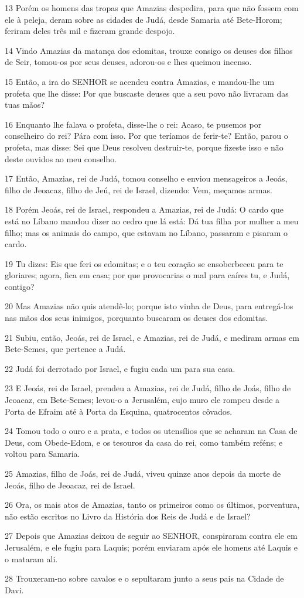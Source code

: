 \par 13 Porém os homens das tropas que Amazias despedira, para que não fossem com ele à peleja, deram sobre as cidades de Judá, desde Samaria até Bete-Horom; feriram deles três mil e fizeram grande despojo.
\par 14 Vindo Amazias da matança dos edomitas, trouxe consigo os deuses dos filhos de Seir, tomou-os por seus deuses, adorou-os e lhes queimou incenso.
\par 15 Então, a ira do SENHOR se acendeu contra Amazias, e mandou-lhe um profeta que lhe disse: Por que buscaste deuses que a seu povo não livraram das tuas mãos?
\par 16 Enquanto lhe falava o profeta, disse-lhe o rei: Acaso, te pusemos por conselheiro do rei? Pára com isso. Por que teríamos de ferir-te? Então, parou o profeta, mas disse: Sei que Deus resolveu destruir-te, porque fizeste isso e não deste ouvidos ao meu conselho.
\par 17 Então, Amazias, rei de Judá, tomou conselho e enviou mensageiros a Jeoás, filho de Jeoacaz, filho de Jeú, rei de Israel, dizendo: Vem, meçamos armas.
\par 18 Porém Jeoás, rei de Israel, respondeu a Amazias, rei de Judá: O cardo que está no Líbano mandou dizer ao cedro que lá está: Dá tua filha por mulher a meu filho; mas os animais do campo, que estavam no Líbano, passaram e pisaram o cardo.
\par 19 Tu dizes: Eis que feri os edomitas; e o teu coração se ensoberbeceu para te gloriares; agora, fica em casa; por que provocarias o mal para caíres tu, e Judá, contigo?
\par 20 Mas Amazias não quis atendê-lo; porque isto vinha de Deus, para entregá-los nas mãos dos seus inimigos, porquanto buscaram os deuses dos edomitas.
\par 21 Subiu, então, Jeoás, rei de Israel, e Amazias, rei de Judá, e mediram armas em Bete-Semes, que pertence a Judá.
\par 22 Judá foi derrotado por Israel, e fugiu cada um para sua casa.
\par 23 E Jeoás, rei de Israel, prendeu a Amazias, rei de Judá, filho de Joás, filho de Jeoacaz, em Bete-Semes; levou-o a Jerusalém, cujo muro ele rompeu desde a Porta de Efraim até à Porta da Esquina, quatrocentos côvados.
\par 24 Tomou todo o ouro e a prata, e todos os utensílios que se acharam na Casa de Deus, com Obede-Edom, e os tesouros da casa do rei, como também reféns; e voltou para Samaria.
\par 25 Amazias, filho de Joás, rei de Judá, viveu quinze anos depois da morte de Jeoás, filho de Jeoacaz, rei de Israel.
\par 26 Ora, os mais atos de Amazias, tanto os primeiros como os últimos, porventura, não estão escritos no Livro da História dos Reis de Judá e de Israel?
\par 27 Depois que Amazias deixou de seguir ao SENHOR, conspiraram contra ele em Jerusalém, e ele fugiu para Laquis; porém enviaram após ele homens até Laquis e o mataram ali.
\par 28 Trouxeram-no sobre cavalos e o sepultaram junto a seus pais na Cidade de Davi.

